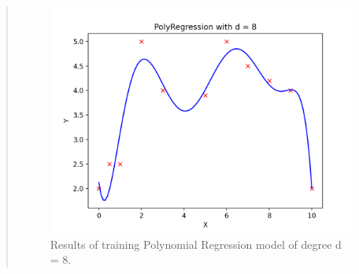 \begin{quote}
    \FloatBarrier
    \begin{figure}
	\captionsetup{labelformat=empty}
	\caption{Results of training Polynomial Regression model of degree d = 8.}
   	\includegraphics[scale=0.5]{./images/fig1.png} 
	\centering
    \end{figure}
    \FloatBarrier
\end{quote}
